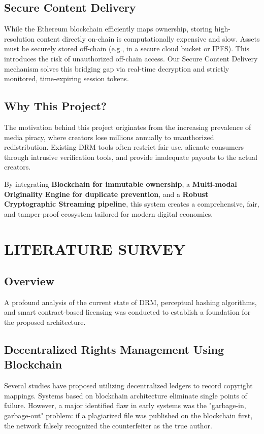 \documentclass[12pt,a4paper]{report}
\begin{document}
\section{Secure Content Delivery}
While the Ethereum blockchain efficiently maps ownership, storing high-resolution content directly on-chain is computationally expensive and slow. Assets must be securely stored off-chain (e.g., in a secure cloud bucket or IPFS). This introduces the risk of unauthorized off-chain access. Our Secure Content Delivery mechanism solves this bridging gap via real-time decryption and strictly monitored, time-expiring session tokens.

\section{Why This Project?}
The motivation behind this project originates from the increasing prevalence of media piracy, where creators lose millions annually to unauthorized redistribution. Existing DRM tools often restrict fair use, alienate consumers through intrusive verification tools, and provide inadequate payouts to the actual creators. 

By integrating \textbf{Blockchain for immutable ownership}, a \textbf{Multi-modal Originality Engine for duplicate prevention}, and a \textbf{Robust Cryptographic Streaming pipeline}, this system creates a comprehensive, fair, and tamper-proof ecosystem tailored for modern digital economies.

\chapter{LITERATURE SURVEY}

\section{Overview}
A profound analysis of the current state of DRM, perceptual hashing algorithms, and smart contract-based licensing was conducted to establish a foundation for the proposed architecture.

\section{Decentralized Rights Management Using Blockchain}
Several studies have proposed utilizing decentralized ledgers to record copyright mappings. Systems based on blockchain architecture eliminate single points of failure. However, a major identified flaw in early systems was the "garbage-in, garbage-out" problem: if a plagiarized file was published on the blockchain first, the network falsely recognized the counterfeiter as the true author. 
\end{document}
